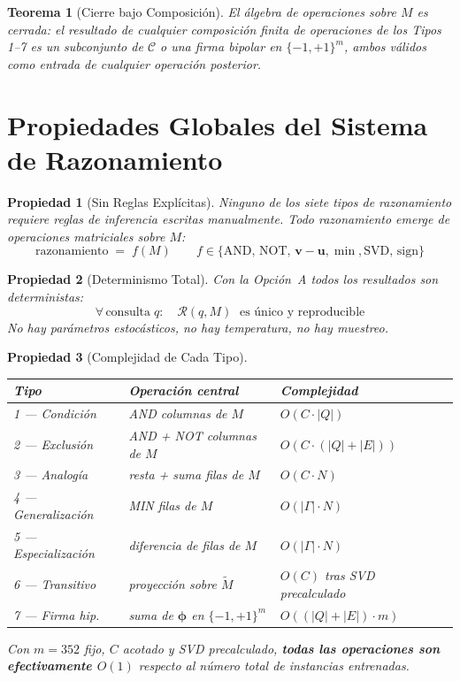 \documentclass[12pt]{article}
\newtheorem{theorem}{Teorema}[section]
\newtheorem{property}{Propiedad}[section]
\begin{document}
\begin{theorem}[Cierre bajo Composición]
	El álgebra de operaciones sobre $M$ es cerrada: el resultado de cualquier
	composición finita de operaciones de los Tipos 1–7 es un subconjunto de
	$\mathcal{C}$ o una firma bipolar en $\{-1,+1\}^m$, ambos válidos como
	entrada de cualquier operación posterior.
\end{theorem}

\section{Propiedades Globales del Sistema de Razonamiento}

\begin{property}[Sin Reglas Explícitas]
	Ninguno de los siete tipos de razonamiento requiere reglas de inferencia
	escritas manualmente. Todo razonamiento emerge de operaciones matriciales
	sobre $M$:
	\[
	\text{razonamiento} \;=\; f(M) \qquad f \in \{\text{AND, NOT, }\mathbf{v}-\mathbf{u},
	\min, \text{SVD, sign}\}
	\]
\end{property}

\begin{property}[Determinismo Total]
	Con la Opción~A todos los resultados son deterministas:
	\[
	\forall\,\text{consulta}\; q:\quad
	\mathcal{R}(q, M) \;\text{ es único y reproducible}
	\]
	No hay parámetros estocásticos, no hay temperatura, no hay muestreo.
\end{property}

\begin{property}[Complejidad de Cada Tipo]
	\begin{center}
		\begin{tabular}{llll}
			\toprule
			\textbf{Tipo} & \textbf{Operación central} & \textbf{Complejidad} \\
			\midrule
			1 — Condición    & AND columnas de $M$            & $O(C \cdot |Q|)$            \\
			2 — Exclusión    & AND + NOT columnas de $M$      & $O(C \cdot (|Q|+|E|))$      \\
			3 — Analogía     & resta + suma filas de $M$      & $O(C \cdot N)$              \\
			4 — Generalización & MIN filas de $M$             & $O(|\Gamma| \cdot N)$       \\
			5 — Especialización & diferencia de filas de $M$  & $O(|\Gamma| \cdot N)$       \\
			6 — Transitivo   & proyección sobre $\tilde{M}$   & $O(C)$ tras SVD precalculado\\
			7 — Firma hip.   & suma de $\bm{\phi}$ en $\{-1,+1\}^m$ & $O((|Q|+|E|)\cdot m)$ \\
			\bottomrule
		\end{tabular}
	\end{center}
	Con $m=352$ fijo, $C$ acotado y SVD precalculado, \textbf{todas las operaciones
		son efectivamente $O(1)$} respecto al número total de instancias entrenadas.
\end{property}
\end{document}

